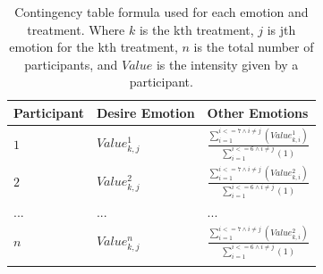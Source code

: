 \begin{table}
\caption{Contingency table formula used for each emotion and treatment. Where $k$ is the kth treatment, $j$ is jth emotion for the kth treatment, $n$ is the total number of participants, and $Value$ is the intensity given by a participant.}
\label{table:table_contingency}
\small
\begin{tabular}{|l|l|l|}
\hline
Participant & Desire Emotion & Other Emotions \\
\hline
$1$ & $Value_{k,j}^{1}$  & $\frac{\sum_{i=1}^{i<=7 \wedge i \neq j}(Value_{k,i}^{1})}{\sum_{i=1}^{i<=6 \wedge i \neq j}(1)}$\\
\hline
$2$ & $Value_{k,j}^{2}$ & $\frac{\sum_{i=1}^{i<=7 \wedge i \neq j}(Value_{k,i}^{2})}{\sum_{i=1}^{i<=6 \wedge i \neq j}(1)}$\\
\hline
... & ... & ...\\
\hline
$n$ & $Value_{k,j}^{n}$ & $\frac{\sum_{i=1}^{i<=7 \wedge i \neq j}(Value_{k,i}^{2})}{\sum_{i=1}^{i<=6 \wedge i \neq j}(1)}$\\
\hline
\multicolumn{3}{c}{}
\end{tabular}
\end{table}